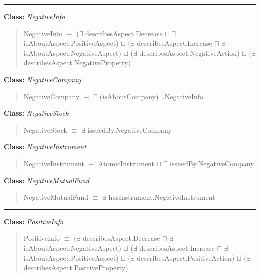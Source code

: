 \documentclass[
]{article}
\begin{document}
\begin{center}\rule{0.5\linewidth}{0.5pt}\end{center}

\textbf{Class:} \emph{NegativeInfo}

\begin{quote}
NegativeInfo \(\equiv\) (\(\exists\) describesAspect.Decrease \(\sqcap\)
\(\exists\) isAboutAspect.PositiveAspect) \(\sqcup\) (\(\exists\)
describesAspect.Increase \(\sqcap\) \(\exists\)
isAboutAspect.NegativeAspect) \(\sqcup\) (\(\exists\)
describesAspect.NegativeAction) \(\sqcup\) (\(\exists\)
describesAspect.NegativeProperty)
\end{quote}

\textbf{Class:} \emph{NegativeCompany}

\begin{quote}
NegativeCompany \(\equiv\) \(\exists\)
(isAboutCompany)\(^{-}\).NegativeInfo
\end{quote}

\textbf{Class:} \emph{NegativeStock}

\begin{quote}
NegativeStock \(\equiv\) \(\exists\) issuedBy.NegativeCompany
\end{quote}

\textbf{Class:} \emph{NegativeInstrument}

\begin{quote}
NegativeInstrument \(\equiv\) AtomicInstrument \(\sqcap\) \(\exists\)
issuedBy.NegativeCompany
\end{quote}

\textbf{Class:} \emph{NegativeMutualFund}

\begin{quote}
NegativeMutualFund \(\equiv\) \(\exists\)
hasInstrument.NegativeInstrument
\end{quote}

\begin{center}\rule{0.5\linewidth}{0.5pt}\end{center}

\textbf{Class:} \emph{PositiveInfo}

\begin{quote}
PositiveInfo \(\equiv\) (\(\exists\) describesAspect.Decrease \(\sqcap\)
\(\exists\) isAboutAspect.NegativeAspect) \(\sqcup\) (\(\exists\)
describesAspect.Increase \(\sqcap\) \(\exists\)
isAboutAspect.PositiveAspect) \(\sqcup\) (\(\exists\)
describesAspect.PositiveAction) \(\sqcup\) (\(\exists\)
describesAspect.PositiveProperty)
\end{quote}
\end{document}
